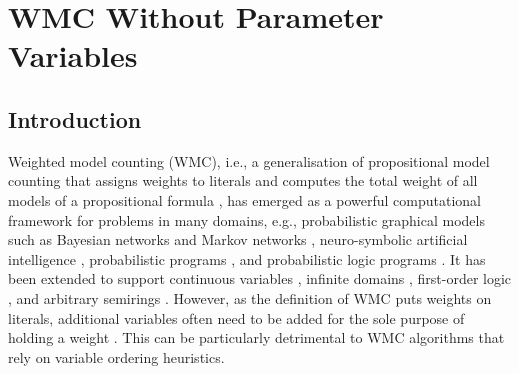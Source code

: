 \chapter{WMC Without Parameter Variables} \label{chapter:wmc2}

\section{Introduction}


Weighted model counting (WMC), i.e., a generalisation of propositional model
counting that assigns weights to literals and computes the total weight of all
models of a propositional formula \citep{DBLP:journals/ai/ChaviraD08}, has
emerged as a powerful computational framework for problems in many domains,
e.g., probabilistic graphical models such as Bayesian networks and Markov
networks
\citep{DBLP:conf/ecai/BartKLM16,DBLP:conf/ijcai/ChaviraD05,DBLP:conf/sat/ChaviraD06,DBLP:conf/kr/Darwiche02,DBLP:conf/aaai/SangBK05},
neuro-symbolic artificial intelligence \citep{DBLP:conf/icml/XuZFLB18},
probabilistic programs \citep{DBLP:journals/pacmpl/HoltzenBM20}, and
probabilistic logic programs \citep{DBLP:journals/tplp/FierensBRSGTJR15}. It has
been extended to support continuous variables \citep{DBLP:conf/ijcai/BellePB15},
infinite domains \citep{DBLP:conf/aaai/Belle17}, first-order logic
\citep{DBLP:journals/cacm/GogateD16,DBLP:conf/ijcai/BroeckTMDR11}, and arbitrary
semirings \citep{DBLP:journals/ijar/BelleR20,DBLP:journals/japll/KimmigBR17}.
However, as the definition of WMC puts weights on literals, additional variables
often need to be added for the sole purpose of holding a weight
\citep{DBLP:conf/ecai/BartKLM16,DBLP:conf/ijcai/ChaviraD05,DBLP:conf/sat/ChaviraD06,DBLP:conf/kr/Darwiche02,DBLP:conf/aaai/SangBK05}.
This can be particularly detrimental to WMC algorithms that rely on variable
ordering heuristics.

